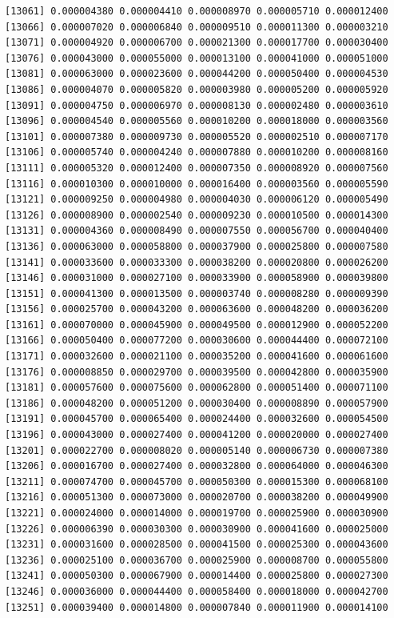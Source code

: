 \documentclass[]{article}
\begin{document}
\begin{verbatim}
[13061] 0.000004380 0.000004410 0.000008970 0.000005710 0.000012400
[13066] 0.000007020 0.000006840 0.000009510 0.000011300 0.000003210
[13071] 0.000004920 0.000006700 0.000021300 0.000017700 0.000030400
[13076] 0.000043000 0.000055000 0.000013100 0.000041000 0.000051000
[13081] 0.000063000 0.000023600 0.000044200 0.000050400 0.000004530
[13086] 0.000004070 0.000005820 0.000003980 0.000005200 0.000005920
[13091] 0.000004750 0.000006970 0.000008130 0.000002480 0.000003610
[13096] 0.000004540 0.000005560 0.000010200 0.000018000 0.000003560
[13101] 0.000007380 0.000009730 0.000005520 0.000002510 0.000007170
[13106] 0.000005740 0.000004240 0.000007880 0.000010200 0.000008160
[13111] 0.000005320 0.000012400 0.000007350 0.000008920 0.000007560
[13116] 0.000010300 0.000010000 0.000016400 0.000003560 0.000005590
[13121] 0.000009250 0.000004980 0.000004030 0.000006120 0.000005490
[13126] 0.000008900 0.000002540 0.000009230 0.000010500 0.000014300
[13131] 0.000004360 0.000008490 0.000007550 0.000056700 0.000040400
[13136] 0.000063000 0.000058800 0.000037900 0.000025800 0.000007580
[13141] 0.000033600 0.000033300 0.000038200 0.000020800 0.000026200
[13146] 0.000031000 0.000027100 0.000033900 0.000058900 0.000039800
[13151] 0.000041300 0.000013500 0.000003740 0.000008280 0.000009390
[13156] 0.000025700 0.000043200 0.000063600 0.000048200 0.000036200
[13161] 0.000070000 0.000045900 0.000049500 0.000012900 0.000052200
[13166] 0.000050400 0.000077200 0.000030600 0.000044400 0.000072100
[13171] 0.000032600 0.000021100 0.000035200 0.000041600 0.000061600
[13176] 0.000008850 0.000029700 0.000039500 0.000042800 0.000035900
[13181] 0.000057600 0.000075600 0.000062800 0.000051400 0.000071100
[13186] 0.000048200 0.000051200 0.000030400 0.000008890 0.000057900
[13191] 0.000045700 0.000065400 0.000024400 0.000032600 0.000054500
[13196] 0.000043000 0.000027400 0.000041200 0.000020000 0.000027400
[13201] 0.000022700 0.000008020 0.000005140 0.000006730 0.000007380
[13206] 0.000016700 0.000027400 0.000032800 0.000064000 0.000046300
[13211] 0.000074700 0.000045700 0.000050300 0.000015300 0.000068100
[13216] 0.000051300 0.000073000 0.000020700 0.000038200 0.000049900
[13221] 0.000024000 0.000014000 0.000019700 0.000025900 0.000030900
[13226] 0.000006390 0.000030300 0.000030900 0.000041600 0.000025000
[13231] 0.000031600 0.000028500 0.000041500 0.000025300 0.000043600
[13236] 0.000025100 0.000036700 0.000025900 0.000008700 0.000055800
[13241] 0.000050300 0.000067900 0.000014400 0.000025800 0.000027300
[13246] 0.000036000 0.000044400 0.000058400 0.000018000 0.000042700
[13251] 0.000039400 0.000014800 0.000007840 0.000011900 0.000014100

\end{verbatim}
\end{document}
